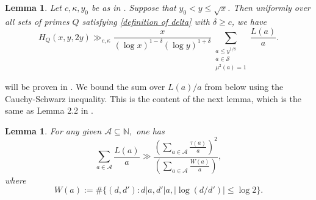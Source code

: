 \documentclass{amsart}
\newtheorem{lemma}[theorem]{Lemma}
\theoremstyle{definition}
\numberwithin{equation}{section}
\newcommand{\N}{\mathbb{N}}
\renewcommand{\S}{\mathcal{S}}
\newcommand{\density}{\delta}
\begin{document}
	\begin{lemma}\label{LB initial reduction}
	Let $c,\kappa,y_0$ be as in . Suppose that $y_0 < y \leq \sqrt{x}$. Then uniformly over all sets of primes $Q$ satisfying \eqref{definition of delta} with $\density \ge c$, we have  
		$$H_Q(x,y,2y) \gg_{c,\kappa} \frac{x}{(\log x)^{1-\density}(\log y)^{1+\density}} \sum_{\substack{a \leq y^{1/8} \\ a \in \S \\ \mu^2(a) = 1}} \frac{L(a)}{a}.$$
	\end{lemma}
	 will be proven in . We bound the sum over $L(a)/a$ from below using the Cauchy-Schwarz inequality. This is the content of the next lemma, which is the same as Lemma 2.2 in \cite{ford2006integers}.
	\begin{lemma}\label{cauchy schwarz L}
		For any given $\mathscr{A} \subseteq \N,$ one has 
		\begin{equation}\label{CS 1}
			\sum_{a \in \mathscr{A}} \frac{L(a)}{a} \gg  \frac{\left(\sum_{a \in \mathscr{A}} \frac{\tau(a)}{a}\right)^2}{\left( \sum_{a \in \mathscr{A}} \frac{W(a)}{a}\right)},
		\end{equation}
		where \begin{equation}
			W(a) := \#\{(d,d'):d|a,d'|a, |\log(d/d')| \leq \log 2\}.
		\end{equation}
	\end{lemma}
	
\end{document}
